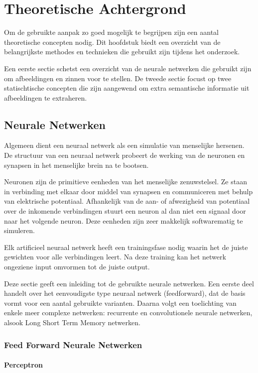 \chapter{Theoretische Achtergrond}
\label{hst-theorie}
Om de gebruikte aanpak zo goed mogelijk te begrijpen zijn een aantal theoretische concepten nodig. Dit hoofdstuk biedt een overzicht van de belangrijkste methodes en technieken die gebruikt zijn tijdens het onderzoek.

Een eerste sectie schetst een overzicht van de neurale netwerken die gebruikt zijn om afbeeldingen en zinnen voor te stellen. De tweede sectie focust op twee statischtische concepten die zijn aangewend om extra semantische informatie uit afbeeldingen te extraheren. 

\section{Neurale Netwerken}
Algemeen dient een neuraal netwerk als een simulatie van menselijke hersenen. De structuur van een neuraal netwerk probeert de werking van de neuronen en synapsen in het menselijke brein na te bootsen. 

Neuronen zijn de primitieve eenheden van het menselijke zenuwstelsel. Ze staan in verbinding met elkaar door middel van synapsen en communiceren met behulp van elektrische potentiaal. Afhankelijk van de aan- of afwezigheid van potentiaal over de inkomende verbindingen stuurt een neuron al dan niet een signaal door naar het volgende neuron. Deze eenheden zijn zeer makkelijk softwarematig te simuleren.

Elk artificieel neuraal netwerk heeft een trainingsfase nodig waarin het de juiste gewichten voor alle verbindingen leert. Na deze training kan het netwerk ongeziene input omvormen tot de juiste output.

Deze sectie geeft een inleiding tot de gebruikte neurale netwerken. Een eerste deel handelt over het eenvoudigste type neuraal netwerk (feedforward), dat de basis vormt voor een aantal gebruikte varianten. Daarna volgt een toelichting van enkele meer complexe netwerken: recurrente en convolutionele neurale netwerken, alsook Long Short Term Memory netwerken.

\subsection{Feed Forward Neurale Netwerken}
\subsubsection{Perceptron} %
\label{par:perceptron}

